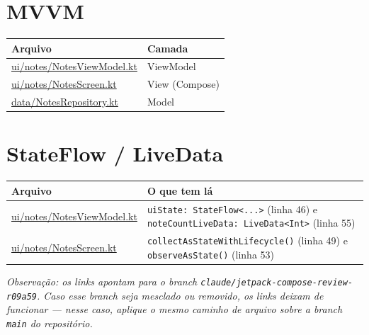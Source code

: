 \documentclass[11pt,a4paper]{article}
\newcommand{\repobase}{https://github.com/stpedr/curriculo/blob/claude/jetpack-compose-review-r09a59/jetpack-compose-review/}
\begin{document}
\section*{MVVM}
\begin{longtable}{L{5.4cm}L{8.5cm}}
\textbf{Arquivo} & \textbf{Camada} \\ \hline \endhead
\href{\repobase app/src/main/java/com/pedro/composereview/ui/notes/NotesViewModel.kt\#L33}{\url{ui/notes/NotesViewModel.kt}} &
ViewModel \\
\href{\repobase app/src/main/java/com/pedro/composereview/ui/notes/NotesScreen.kt\#L44}{\url{ui/notes/NotesScreen.kt}} &
View (Compose) \\
\href{\repobase app/src/main/java/com/pedro/composereview/data/NotesRepository.kt\#L23}{\url{data/NotesRepository.kt}} &
Model \\
\end{longtable}

\section*{StateFlow / LiveData}
\begin{longtable}{L{5.4cm}L{8.5cm}}
\textbf{Arquivo} & \textbf{O que tem lá} \\ \hline \endhead
\href{\repobase app/src/main/java/com/pedro/composereview/ui/notes/NotesViewModel.kt\#L46}{\url{ui/notes/NotesViewModel.kt}} &
\texttt{uiState: StateFlow<...>} (linha 46) e \texttt{noteCountLiveData: LiveData<Int>} (linha 55) \\
\href{\repobase app/src/main/java/com/pedro/composereview/ui/notes/NotesScreen.kt\#L49}{\url{ui/notes/NotesScreen.kt}} &
\texttt{collectAsStateWithLifecycle()} (linha 49) e \texttt{observeAsState()} (linha 53) \\
\end{longtable}

\vspace{1em}
\noindent\textit{Observação: os links apontam para o branch
\texttt{claude/jetpack-compose-review-r09a59}. Caso esse branch seja
mesclado ou removido, os links deixam de funcionar — nesse caso, aplique
o mesmo caminho de arquivo sobre a branch \texttt{main} do repositório.}
\end{document}
